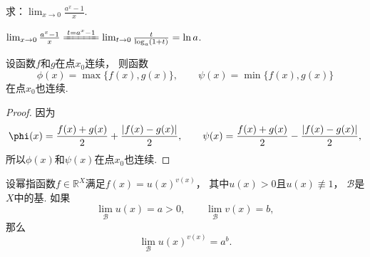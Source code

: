 \begin{example}
求：\(\lim_{x\to0} \frac{a^x - 1}{x}\).
\begin{solution}
\(\lim_{x\to0} \frac{a^x - 1}{x}
\xlongequal{t=a^x-1} \lim_{t\to0}\frac{t}{\log_a (1+t)}
= \ln a\).
\end{solution}
\end{example}

\begin{proposition}
设函数\(f\)和\(g\)在点\(x_0\)连续，
则函数\[
	\phi(x) = \max\{f(x),g(x)\}, \qquad
	\psi(x) = \min\{f(x),g(x)\}
\]在点\(x_0\)也连续.
\begin{proof}
因为\[
	\phi(x)
	= \frac{f(x)+g(x)}{2}+\frac{\abs{f(x)-g(x)}}{2}, \qquad
	\psi(x)
	= \frac{f(x)+g(x)}{2}-\frac{\abs{f(x)-g(x)}}{2},
\]
所以\(\phi(x)\)和\(\psi(x)\)在点\(x_0\)也连续.
\end{proof}
\end{proposition}

\begin{proposition}
设幂指函数\(f\in\mathbb{R}^X\)满足\(f(x) = u(x)^{v(x)}\)，
其中\(u(x) > 0\)且\(u(x) \not\equiv 1\)，
\(\mathcal{B}\)是\(X\)中的基.
如果\[
	\lim_\mathcal{B} u(x) = a > 0, \qquad
	\lim_\mathcal{B} v(x) = b,
\]
那么\[
	\lim_\mathcal{B} u(x)^{v(x)} = a^b.
\]
\end{proposition}
